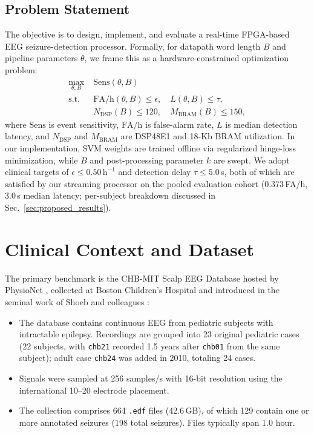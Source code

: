 \documentclass[10pt,twocolumn,letterpaper]{article}
\begin{document}
\subsection{Problem Statement}
\label{sec:problem}

The objective is to design, implement, and evaluate a real-time FPGA-based EEG seizure-detection processor. Formally, for datapath word length $B$ and pipeline parameters $\theta$, we frame this as a hardware-constrained optimization problem:
\begin{equation}
\begin{aligned}
\max_{\theta,B}\;& \mathrm{Sens}(\theta,B)\\
\text{s.t.}\;& \mathrm{FA/h}(\theta,B)\le\epsilon,\quad L(\theta,B)\le\tau,\\
& N_{\mathrm{DSP}}(B)\le 120,\quad M_{\mathrm{BRAM}}(B)\le 150,
\end{aligned}
\label{eq:problem}
\end{equation}
where $\mathrm{Sens}$ is event sensitivity, $\mathrm{FA/h}$ is false-alarm rate, $L$ is median detection latency, and $N_{\mathrm{DSP}}$ and $M_{\mathrm{BRAM}}$ are DSP48E1 and 18-Kb BRAM utilization. In our implementation, SVM weights are trained offline via regularized hinge-loss minimization, while $B$ and post-processing parameter $k$ are swept. We adopt clinical targets of $\epsilon \le 0.50\,\text{h}^{-1}$ and detection delay $\tau \le 5.0$\,s, both of which are satisfied by our streaming processor on the pooled evaluation cohort (0.373\,FA/h, 3.0\,s median latency; per-subject breakdown discussed in Sec.~\ref{sec:proposed_results}).

\section{Clinical Context and Dataset}
\label{sec:dataset}

The primary benchmark is the CHB-MIT Scalp EEG Database hosted by PhysioNet \cite{guttag2010chbmit,goldberger2000physionet}, collected at Boston Children's Hospital and introduced in the seminal work of Shoeb and colleagues \cite{shoeb2009thesis,shoeb2010icml}:
\begin{itemize}
  \item The database contains continuous EEG from pediatric subjects with intractable epilepsy. Recordings are grouped into 23 original pediatric cases (22 subjects, with \texttt{chb21} recorded 1.5 years after \texttt{chb01} from the same subject); adult case \texttt{chb24} was added in 2010, totaling 24 cases.
  \item Signals were sampled at 256 samples/s with 16-bit resolution using the international 10--20 electrode placement.
  \item The collection comprises 664 \texttt{.edf} files (42.6\,GB), of which 129 contain one or more annotated seizures (198 total seizures). Files typically span 1.0 hour.
\end{itemize}
\end{document}
